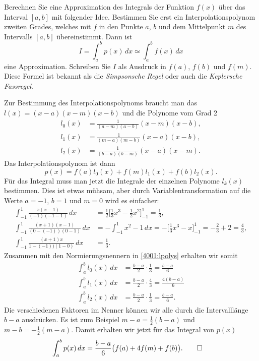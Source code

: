 Berechnen Sie eine Approximation des Integrals der Funktion
$f(x)$ über das Interval $[a,b]$ mit folgender Idee.
Bestimmen Sie erst ein Interpolationspolynom zweiten Grades, welches
mit $f$ in den Punkte $a$, $b$ und dem Mittelpunkt $m$ des Intervalls
$[a,b]$ übereinstimmt.
Dann ist
\[
I=\int_a^b p(x)\,dx
\simeq
\int_a^b f(x)\,dx
\]
eine Approximation.
Schreiben Sie $I$ als Ausdruck in $f(a)$, $f(b)$ und $f(m)$.
Diese Formel ist bekannt als die {\em Simpsonsche Regel} 
oder auch die
{\em Keplersche Fassregel}.


\begin{loesung}
Zur Bestimmung des Interpolationspolynoms braucht man das
$l(x) = (x-a)(x-m)(x-b)$ und die Polynome vom Grad 2
\begin{equation}
\begin{aligned}
l_0(x) &= \frac1{(a-m)(a-b)} (x-m)(x-b),
\\
l_1(x) &= \frac1{(m-a)(m-b)} (x-a)(x-b),
\\
l_2(x) &= \frac1{(b-a)(b-m)} (x-a)(x-m).
\end{aligned}
\label{4001:lpolys}
\end{equation}
Das Interpolationspolynom ist dann
\[
p(x) = f(a) l_0(x) + f(m) l_1(x) + f(b) l_2(x).
\]
Für das Integral muss man jetzt die Integrale der einzelnen Polynome 
$l_k(x)$ bestimmen.
Dies ist etwas mühsam, aber durch Variablentransformation auf
die Werte $a=-1$, $b=1$ und $m=0$ wird es einfacher:
\begin{align*}
\int_{-1}^1 \frac{x(x-1)}{(-1)(-1-1)}\,dx
&=
\frac12
\biggl[\frac13x^3 -\frac12x^2\biggr]_{-1}^1
=
\frac13,
\\
\int_{-1}^1 \frac{(x+1)(x-1)}{(0-(-1))(0-1)}\,dx
&=
-\int_{-1}^1 x^2 -1 \,dx
=
-\biggl[\frac13x^3-x\biggr]_{-1}^1
=
-\frac23 + 2
=
\frac43,
\\
\int_{-1}^1 \frac{(x+1)x}{1-(-1))(1-0)}\,dx
&=
\frac13.
\end{align*}
Zusammen mit den Normierungsnennern in \eqref{4001:lpolys} erhalten wir
somit
\begin{align*}
\int_a^b l_0(x)\,dx
&=
\frac{b-a}{2}
\cdot
\frac13
=
\frac{b-a}6
\\
\int_a^b l_1(x)\,dx
&=
\frac{b-a}{2}
\cdot
\frac{4}{3}
=
\frac{4(b-a)}{6}
\\
\int_a^b l_2(x)\,dx
&=
\frac{b-a}{2}
\cdot
\frac13
=
\frac{b-a}{6}.
\end{align*}
Die verschiedenen Faktoren im Nenner können wir alle durch die
Intervalllänge $b-a$ ausdrücken. 
Es ist zum Beispiel $m-a=\frac12(b-a)$ und $m-b=-\frac12(m-a)$.
Damit erhalten wir jetzt für das Integral von $p(x)$
\begin{align*}
\int_a^b p(x)\,dx
&=
\frac{b-a}{6}\bigl(f(a) + 4f(m) + f(b)\bigr).
\qedhere
\end{align*}
\end{loesung}




